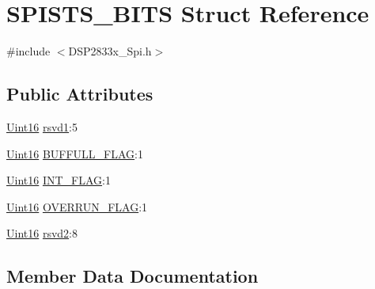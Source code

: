 \hypertarget{struct_s_p_i_s_t_s___b_i_t_s}{}\section{S\+P\+I\+S\+T\+S\+\_\+\+B\+I\+T\+S Struct Reference}
\label{struct_s_p_i_s_t_s___b_i_t_s}


{\ttfamily \#include $<$D\+S\+P2833x\+\_\+\+Spi.\+h$>$}

\subsection*{Public Attributes}
\begin{DoxyCompactItemize}
\item 
\hyperlink{_d_s_p2833x___device_8h_a59a9f6be4562c327cbfb4f7e8e18f08b}{Uint16} \hyperlink{struct_s_p_i_s_t_s___b_i_t_s_a9e9798080b72bfb25f9c8c9bb8261f21}{rsvd1}\+:5
\item 
\hyperlink{_d_s_p2833x___device_8h_a59a9f6be4562c327cbfb4f7e8e18f08b}{Uint16} \hyperlink{struct_s_p_i_s_t_s___b_i_t_s_a48c76a4e00f7ca4bcae0e5552825b617}{B\+U\+F\+F\+U\+L\+L\+\_\+\+F\+L\+A\+G}\+:1
\item 
\hyperlink{_d_s_p2833x___device_8h_a59a9f6be4562c327cbfb4f7e8e18f08b}{Uint16} \hyperlink{struct_s_p_i_s_t_s___b_i_t_s_a4687065b301e62593446853b20c2f273}{I\+N\+T\+\_\+\+F\+L\+A\+G}\+:1
\item 
\hyperlink{_d_s_p2833x___device_8h_a59a9f6be4562c327cbfb4f7e8e18f08b}{Uint16} \hyperlink{struct_s_p_i_s_t_s___b_i_t_s_a8d7d083e4513a2baa2fbd3e0664e29c3}{O\+V\+E\+R\+R\+U\+N\+\_\+\+F\+L\+A\+G}\+:1
\item 
\hyperlink{_d_s_p2833x___device_8h_a59a9f6be4562c327cbfb4f7e8e18f08b}{Uint16} \hyperlink{struct_s_p_i_s_t_s___b_i_t_s_aa90b2c8ec2b89ae143952e6d8fe9e232}{rsvd2}\+:8
\end{DoxyCompactItemize}


\subsection{Member Data Documentation}
\hypertarget{struct_s_p_i_s_t_s___b_i_t_s_a48c76a4e00f7ca4bcae0e5552825b617}{}
